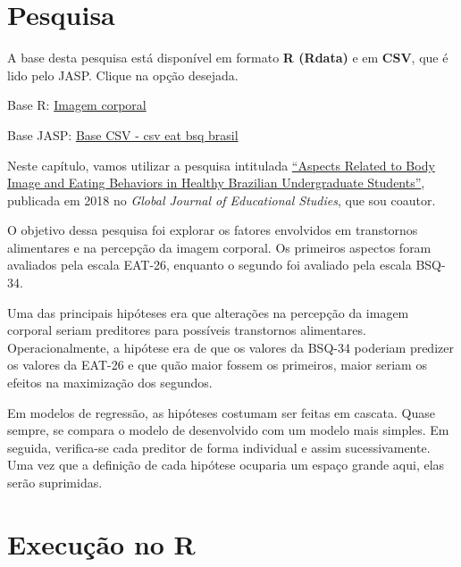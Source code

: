 \documentclass[
]{book}
\newenvironment{base}{
  \definecolor{shadecolor}{rgb}{0, 0, 0}  %
  \color{white}
  \begin{shaded}}
 {\end{shaded}}
\begin{document}
\hypertarget{pesquisa-4}{%
\section{Pesquisa}\label{pesquisa-4}}

\begin{base}

A base desta pesquisa está disponível em formato \textbf{R (Rdata)} e em \textbf{CSV}, que é lido pelo JASP. Clique na opção desejada.

Base R: \href{https://github.com/anovabr/mqt/raw/master/bases/Base\%20R\%20-\%20imagem\%20corporal.RData}{Imagem corporal}

Base JASP: \href{https://github.com/anovabr/mqt/raw/master/bases/bases_csv_jasp.zip}{Base CSV - csv eat bsq brasil}

\end{base}

Neste capítulo, vamos utilizar a pesquisa intitulada \href{https://www.researchgate.net/publication/323729370_Aspects_Related_to_Body_Image_and_Eating_Behaviors_in_Healthy_Brazilian_Undergraduate_Students}{``Aspects Related to Body Image and Eating Behaviors in Healthy Brazilian Undergraduate Students''}, publicada em 2018 no \emph{Global Journal of Educational Studies}, que sou coautor.

O objetivo dessa pesquisa foi explorar os fatores envolvidos em transtornos alimentares e na percepção da imagem corporal. Os primeiros aspectos foram avaliados pela escala EAT-26, enquanto o segundo foi avaliado pela escala BSQ-34.

Uma das principais hipóteses era que alterações na percepção da imagem corporal seriam preditores para possíveis transtornos alimentares. Operacionalmente, a hipótese era de que os valores da BSQ-34 poderiam predizer os valores da EAT-26 e que quão maior fossem os primeiros, maior seriam os efeitos na maximização dos segundos.

Em modelos de regressão, as hipóteses costumam ser feitas em cascata. Quase sempre, se compara o modelo de desenvolvido com um modelo mais simples. Em seguida, verifica-se cada preditor de forma individual e assim sucessivamente. Uma vez que a definição de cada hipótese ocuparia um espaço grande aqui, elas serão suprimidas.

\hypertarget{execuuxe7uxe3o-no-r-6}{%
\section{Execução no R}\label{execuuxe7uxe3o-no-r-6}}
\end{document}
